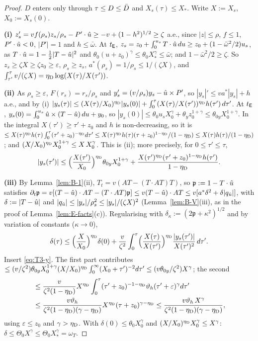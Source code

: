 \begin{proof}
$D$ enters only through $\tau\le D\le\bar D$ and $X_s(\tau)\le X_*$. Write $X:=X_s$, $X_0:=X_s(0)$.

\textbf{(i)} $z_s'=vf(\rho_s)z_s/\rho_s-P'\cdot\hat u\ge-v+(1-h^2)^{1/2}\ge\zeta$ a.e., since $|z|\le\rho$, $f\le1$, $P'\cdot\hat u<0$,
$|P'|=1$ and $h\le\bar\omega$. At $t_{\mathsf E}$, $z_s=z_0+\int_0^{u_s}T\cdot\hat u\,du\ge z_0+(1-\bar\omega^2/2)u_s$, as
$T\cdot\hat u=1-\frac12|T-\hat u|^2$ and $\theta_0(u+z_0)^\gamma\le\theta_0X_*^\gamma\le\bar\omega$; and $1-\bar\omega^2/2\ge\zeta$. So
$z_s\ge\zeta X\ge\zeta z_0\ge\varepsilon$, $\rho_s\ge z_s$, $a^*(\rho_s)=1/\rho_s\le1/(\zeta X)$, and
$\int_{\tau'}^\tau v/(\zeta X)=\eta_{\mathrm D}\log(X(\tau)/X(\tau'))$.

\textbf{(ii)} As $\rho_s\ge\varepsilon$, $F(r_s)=r_s/\rho_s$ and $y_s'=(v/\rho_s)y_s-\hat u\times P'$, so $|y_s|'\le va^*|y_s|+h$ a.e., and by (i)
$|y_s(\tau)|\le(X(\tau)/X_0)^{\eta_{\mathrm D}}|y_s(0)|+\int_0^\tau(X(\tau)/X(\tau'))^{\eta_{\mathrm D}}h(\tau')\,d\tau'$. At $t_{\mathsf E}$,
$y_s(0)=\int_0^{u_s}\hat u\times(T-\hat u)\,du+y_0$, so $|y_s(0)|\le\theta_0u_sX_0^\gamma+\theta_yz_0^{1+\gamma}\le\theta_{0y}X_0^{1+\gamma}$. In the
integral $X(\tau')\ge\tau'+z_0$ and $h$ is non-decreasing, so it is
$\le X(\tau)^{\eta_{\mathrm D}}h(\tau)\int_0^\tau(\tau'+z_0)^{-\eta_{\mathrm D}}d\tau'\le X(\tau)^{\eta_{\mathrm D}}h(\tau)(\tau+z_0)^{1-\eta_{\mathrm D}}/(1-\eta_{\mathrm D})\le X(\tau)h(\tau)/(1-\eta_{\mathrm D})$;
and $(X/X_0)^{\eta_{\mathrm D}}X_0^{1+\gamma}\le X\,X_0^\gamma$. This is (ii); more precisely, for $0\le\tau'\le\tau$,
\begin{equation}\label{eq:T3-y}
|y_s(\tau')|\le\Bigl(\frac{X(\tau')}{X_0}\Bigr)^{\eta_{\mathrm D}}\theta_{0y}X_0^{1+\gamma}+\frac{X(\tau')^{\eta_{\mathrm D}}(\tau'+z_0)^{1-\eta_{\mathrm D}}h(\tau')}{1-\eta_{\mathrm D}}.
\end{equation}

\textbf{(iii)} By Lemma~\ref{lem:B-1}(ii), $T_t=v(AT-(T\cdot AT)T)$, so $\mathfrak p:=1-T\cdot\hat u$ satisfies
$\partial_t\mathfrak p=v[(T-\hat u)\cdot AT-(T\cdot AT)\mathfrak p]\le v(T-\hat u)\cdot AT\le v[a^*\delta^2+\delta|q_{\hat u}|]$, with
$\delta:=|T-\hat u|$ and $|q_{\hat u}|\le|y_s|/\rho_s^2\le|y_s|/(\zeta X)^2$ (Lemma~\ref{lem:B-V}(iii), as in the proof of
Lemma~\ref{lem:E-facts}(c)). Regularising with $\delta_\kappa:=(2\mathfrak p+\kappa^2)^{1/2}$ and by variation of constants
($\kappa\to0$),
\[
\delta(\tau)\le\Bigl(\frac X{X_0}\Bigr)^{\eta_{\mathrm D}}\delta(0)+\frac v{\zeta^2}\int_0^\tau\Bigl(\frac{X(\tau)}{X(\tau')}\Bigr)^{\eta_{\mathrm D}}\frac{|y_s(\tau')|}{X(\tau')^2}\,d\tau'.
\]
Insert \eqref{eq:T3-y}. The first part contributes
$\le(v/\zeta^2)\theta_{0y}X_0^{1+\gamma}(X/X_0)^{\eta_{\mathrm D}}\int_0^\infty(X_0+\tau')^{-2}d\tau'\le(v\theta_{0y}/\zeta^2)X^\gamma$; the second
\begin{align*}
&\le\frac{v}{\zeta^2(1-\eta_{\mathrm D})}X^{\eta_{\mathrm D}}\int_0^\tau(\tau'+z_0)^{-1-\eta_{\mathrm D}}\vartheta_h(\tau'+\varepsilon)^\gamma d\tau'\\
&\le\frac{v\vartheta_h}{\zeta^2(1-\eta_{\mathrm D})(\gamma-\eta_{\mathrm D})}X^{\eta_{\mathrm D}}(\tau+z_0)^{\gamma-\eta_{\mathrm D}}
\le\frac{v\vartheta_h\,X^\gamma}{\zeta^2(1-\eta_{\mathrm D})(\gamma-\eta_{\mathrm D})},
\end{align*}
using $\varepsilon\le z_0$ and $\gamma>\eta_{\mathrm D}$. With $\delta(0)\le\theta_0X_0^\gamma$ and $(X/X_0)^{\eta_{\mathrm D}}X_0^\gamma\le X^\gamma$:
$\delta\le\Theta_0X^\gamma\le\Theta_0X_*^\gamma=\omega_T$.


\end{proof}
